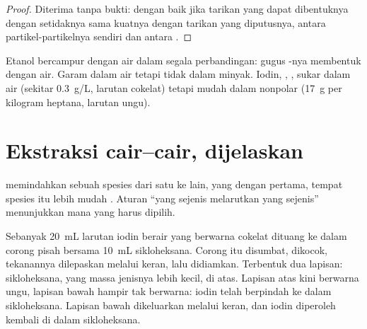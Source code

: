 \begin{proof}
Diterima tanpa bukti:   dengan baik jika tarikan yang
dapat dibentuknya dengan  setidaknya sama kuatnya dengan tarikan
yang diputusnya, antara partikel-partikelnya sendiri dan antara
 .
\end{proof}

\begin{example}\label{ex:g11:dissolution:cases}
Etanol bercampur dengan air dalam segala perbandingan: gugus -nya
membentuk  dengan air. Garam  dalam air tetapi tidak
dalam minyak. Iodin, , , sukar  dalam air
(sekitar \qty{0.3}{g/L}, larutan cokelat) tetapi mudah  dalam
 nonpolar (\qty{17}{g} per kilogram heptana, larutan ungu).
\end{example}

\section{Ekstraksi cair--cair, dijelaskan}

 memindahkan sebuah spesies dari satu  ke
 lain, yang  dengan  pertama, tempat
spesies itu lebih mudah . Aturan ``yang sejenis melarutkan yang
sejenis'' menunjukkan  mana yang harus dipilih.

\begin{inthelab}
Sebanyak \qty{20}{mL} larutan iodin berair yang berwarna cokelat
dituang ke dalam corong pisah bersama \qty{10}{mL} sikloheksana. Corong
itu disumbat, dikocok, tekanannya dilepaskan melalui keran, lalu
didiamkan. Terbentuk dua lapisan: sikloheksana, yang massa jenisnya
lebih kecil, di atas. Lapisan atas kini berwarna ungu, lapisan bawah
hampir tak berwarna: iodin telah berpindah ke dalam sikloheksana.
Lapisan bawah dikeluarkan melalui keran, dan iodin diperoleh kembali
di dalam sikloheksana.
\end{inthelab}

